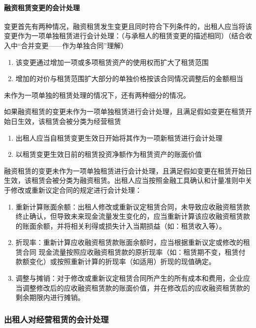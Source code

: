 \documentclass[UTF8,12pt]{ctexart}
\numberwithin{equation}{section} %
\numberwithin{figure}{section}
\numberwithin{table}{section}
\begin{document}
	\paragraph{融资租赁变更的会计处理}
	变更首先有两种情况，融资租赁发生变更且同时符合下列条件的，出租人应当将该变更作为一项单独租赁进行会计处理：（与承租人的租赁变更的描述相同）（结合收入中“合并变更——作为单独合同”理解）
	\begin{enumerate}
		\item 该变更通过增加一项或多项租赁资产的使用权而扩大了租赁范围
		
		\item 增加的对价与租赁范围扩大部分的单独价格按该合同情况调整后的金额相当
	\end{enumerate}

	未作为一项单独的租赁处理的情况下，还有两种细分的情况。
	
	如果融资租赁的变更未作为一项单独租赁进行会计处理，且满足假如变更在租赁开始日生效，该租赁会被分类为经营租赁
	\begin{enumerate}
		\item 出租人应当自租赁变更生效日开始将其作为一项新租赁进行会计处理

		\item 以租赁变更生效日前的租赁投资净额作为租赁资产的账面价值
	\end{enumerate}

	融资租赁的变更未作为一项单独租赁进行会计处理，且满足假如变更在租赁开始日生效，该租赁会被分类为融资租赁。出租人应当按照金融工具确认和计量准则中关于修改或重新议定合同的规定进行会计处理：
	\begin{enumerate}
		\item 重新计算账面余额：出租人修改或重新议定租赁合同，未导致应收融资租赁款终止确认，但导致未来现金流量发生变化的，应当重新计算该应收融资租赁款的账面余额，并将相关利得或损失计入当期损益（如：租赁收入等）。
		
		\item 折现率：重新计算应收融资租赁款账面余额时，应当根据重新议定或修改的租赁合同  现金流量按照应收融资租赁款的原折现率（如：租赁期不变，租赁付款额变化）或按照重新计算的折现率（如适用）折现的现值确定。
		
		\item 调整与摊销：对于修改或重新议定租赁合同所产生的所有成本和费用，企业应当调整修改后的应收融资租赁款的账面价值，并在修改后的应收融资租赁款的剩余期限内进行摊销。
	\end{enumerate}
	
	\subsubsection{出租人对经营租赁的会计处理}
\end{document}
